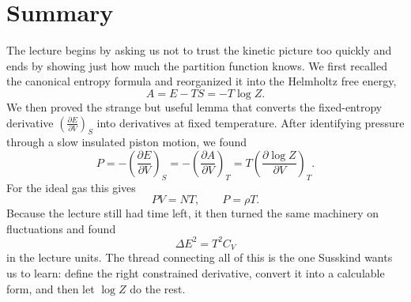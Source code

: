 \section{Summary}

The lecture begins by asking us not to trust the kinetic picture too quickly and ends by showing just how much the partition function knows. We first recalled the canonical entropy formula and reorganized it into the Helmholtz free energy,
\begin{equation}
A=E-TS=-T\log Z.
\end{equation}
We then proved the strange but useful lemma that converts the fixed-entropy derivative \(\left(\frac{\partial E}{\partial V}\right)_S\) into derivatives at fixed temperature. After identifying pressure through a slow insulated piston motion, we found
\begin{equation}
P=-\left(\frac{\partial E}{\partial V}\right)_S
=
-\left(\frac{\partial A}{\partial V}\right)_T
=
T\left(\frac{\partial \log Z}{\partial V}\right)_T.
\end{equation}
For the ideal gas this gives
\begin{equation}
PV=NT,
\qquad
P=\rho T.
\end{equation}
Because the lecture still had time left, it then turned the same machinery on fluctuations and found
\begin{equation}
\Delta E^2=T^2C_V
\end{equation}
in the lecture units. The thread connecting all of this is the one Susskind wants us to learn: define the right constrained derivative, convert it into a calculable form, and then let \(\log Z\) do the rest.
